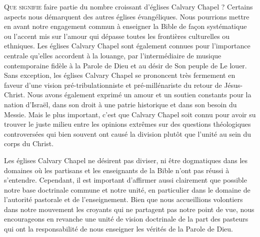 
\begin{pocketpar}{}
\begin{digestpar}{}
\lettrine{Q}{ue signifie} faire partie du nombre \pocketlinebreak
 croissant d'églises Calvary Chapel ?
 Certains aspects nous démarquent des autres églises évangéliques.
 Nous pourrions mettre en avant notre engagement commun à enseigner la Bible
 de façon systématique ou l'accent mis sur l'amour qui dépasse
 toutes les frontières culturelles ou ethniques.
Les églises Calvary Chapel sont également connues pour l'importance centrale
 qu'elles accordent à la louange, par l'intermédiaire de musique con\-tem\-po\-rai\-ne
 fidèle à la Parole de Dieu et au désir de Son peuple de Le louer.
 Sans exception, les églises Calvary Chapel se prononcent très fermement
 en faveur d'une vision pré-tribulationniste et pré-millénariste du retour de Jésus-Christ.
Nous avons également exprimé un amour et un soutien constants pour la nation
 d'Israël,
 dans son droit à une patrie historique et dans son besoin du Messie.
 Mais le plus important, c'est que Calvary Chapel soit connu pour avoir su trouver
 le juste milieu entre les opinions extrêmes sur des questions théologiques
 controversées qui bien souvent ont causé la division plutôt que l'unité
 au sein du corps du Christ.
\end{digestpar}
\end{pocketpar}

\begin{pocketpar}{}
Les églises Calvary Chapel ne désirent pas diviser, ni être dogmatiques
 dans les domaines où les partisans et les enseignants de la Bible
 n'ont pas réussi à s'entendre.
 Cependant, il est important d'affirmer aussi clairement que possible
 notre base doctrinale commune et notre unité, en particulier dans le domaine
 de l'autorité pastorale et de l'enseignement. Bien que nous accueillions
 volontiers dans notre mouvement les croyants qui ne partagent pas notre point de vue,
 nous encourageons en revanche une unité de vision doctrinale de la part des pasteurs
 qui ont la responsabilité de nous enseigner les vérités de la Parole de Dieu.
\end{pocketpar}

